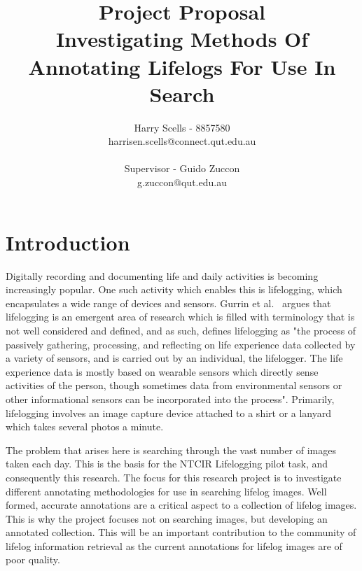 \documentclass[12pt,a4paper]{article}
\begin{document}
\title{\small Project Proposal\\\huge Investigating Methods Of Annotating Lifelogs For Use In Search}

\author{Harry Scells - 8857580\\harrisen.scells@connect.qut.edu.au\\\\\small Supervisor - Guido Zuccon\\\small g.zuccon@qut.edu.au\\}
\maketitle
\pagebreak
\tableofcontents
\pagebreak

\section{Introduction}
Digitally recording and documenting life and daily activities is becoming increasingly popular. One such activity which enables this is lifelogging, which encapsulates a wide range of devices and sensors. Gurrin et al.~\cite{gurrin2014lifelogging} argues that lifelogging is an emergent area of research which is filled with terminology that is not well considered and defined, and as such, defines lifelogging as "the process of passively gathering, processing, and reflecting on life experience data collected by a variety of sensors, and is carried out by an individual, the lifelogger. The life experience data is mostly based on wearable sensors which directly sense activities of the person, though sometimes data from environmental sensors or other informational sensors can be incorporated into the process". Primarily, lifelogging involves an image capture device attached to a shirt or a lanyard which takes several photos a minute.

The problem that arises here is searching through the vast number of images taken each day. This is the basis for the NTCIR Lifelogging pilot task, and consequently this research. The focus for this research project is to investigate different annotating methodologies for use in searching lifelog images. Well formed, accurate annotations are a critical aspect to a collection of lifelog images. This is why the project focuses not on searching images, but developing an annotated collection. This will be an important contribution to the community of lifelog information retrieval as the current annotations for lifelog images are of poor quality.
\end{document}
